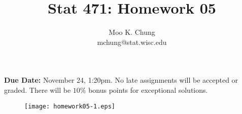 \documentclass[10pt]{article} %
\begin{document}
\title{Stat 471: Homework 05}
\author{Moo K. Chung\\
mchung@stat.wisc.edu}
\maketitle \thispagestyle{empty}

{\bf Due Date:} November 24, 1:20pm. No late assignments will be
accepted or graded. There will be $10\%$ bonus points for
exceptional solutions.


\begin{figure}
\centering
\texttt{[image: homework05-1.eps]}
\end{figure}
\end{document}
